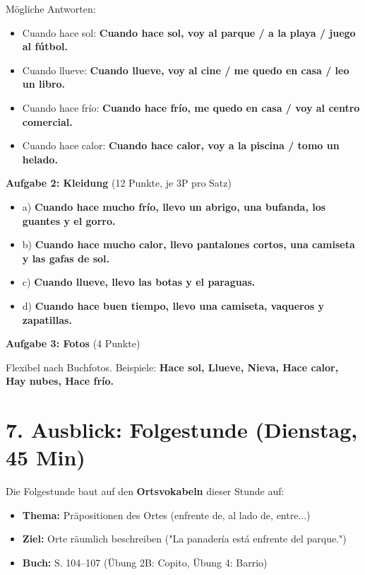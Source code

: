 \documentclass[11pt, a4paper]{article}
\newcommand{\lsg}[1]{\textcolor{loesung}{\textbf{#1}}}
\begin{document}
Mögliche Antworten:
\begin{itemize}
    \item Cuando hace sol: \lsg{Cuando hace sol, voy al parque / a la playa / juego al fútbol.}
    \item Cuando llueve: \lsg{Cuando llueve, voy al cine / me quedo en casa / leo un libro.}
    \item Cuando hace frío: \lsg{Cuando hace frío, me quedo en casa / voy al centro comercial.}
    \item Cuando hace calor: \lsg{Cuando hace calor, voy a la piscina / tomo un helado.}
\end{itemize}

\vspace{0.5em}

\textbf{Aufgabe 2: Kleidung} (12 Punkte, je 3P pro Satz)
\begin{itemize}
    \item a) \lsg{Cuando hace mucho frío, llevo un abrigo, una bufanda, los guantes y el gorro.}
    \item b) \lsg{Cuando hace mucho calor, llevo pantalones cortos, una camiseta y las gafas de sol.}
    \item c) \lsg{Cuando llueve, llevo las botas y el paraguas.}
    \item d) \lsg{Cuando hace buen tiempo, llevo una camiseta, vaqueros y zapatillas.}
\end{itemize}

\vspace{0.5em}

\textbf{Aufgabe 3: Fotos} (4 Punkte)

Flexibel nach Buchfotos. Beispiele: \lsg{Hace sol, Llueve, Nieva, Hace calor, Hay nubes, Hace frío.}


\section*{7. Ausblick: Folgestunde (Dienstag, 45 Min)}

Die Folgestunde baut auf den \textbf{Ortsvokabeln} dieser Stunde auf:

\begin{itemize}
    \item \textbf{Thema:} Präpositionen des Ortes (enfrente de, al lado de, entre...)
    \item \textbf{Ziel:} Orte räumlich beschreiben ("La panadería está enfrente del parque.")
    \item \textbf{Buch:} S. 104--107 (Übung 2B: Copito, Übung 4: Barrio)
\end{itemize}
\end{document}
